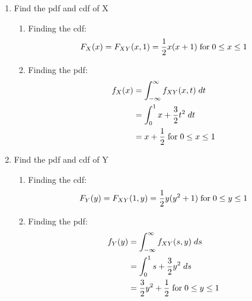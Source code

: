 \documentclass[,oneside]{article}
\begin{document}
\begin{enumerate}
\begin{enumerate}
\item Find the pdf and cdf of X\\
\begin{enumerate}
\item Finding the cdf:
\begin{align*}
F_X(x)=F_{XY}(x,1)=\frac{1}{2}x(x+1) \hspace{0.1cm} \text{for} \hspace{0.1cm} 0 \leq x \leq 1
\end{align*}
\item Finding the pdf:
\begin{align*}
f_X(x) &= \int_{-\infty}^{\infty} f_{XY}(x,t)\hspace{0.1cm}dt\\
&=\int_{0}^{1} x+\frac{3}{2}t^2\hspace{0.1cm}dt\\
&=x+\frac{1}{2} \hspace{0.1cm}\text{for} \hspace{0.1cm} 0 \leq x \leq 1
\end{align*}
\end{enumerate}
\item Find the pdf and cdf of Y\\
\begin{enumerate}
\item Finding the cdf:
\begin{align*}
F_Y(y)=F_{XY}(1,y)=\frac{1}{2}y(y^2+1) \hspace{0.1cm} \text{for} \hspace{0.1cm} 0 \leq y \leq 1
\end{align*}
\item Finding the pdf:
\begin{align*}
f_Y(y) &= \int_{-\infty}^{\infty} f_{XY}(s,y)\hspace{0.1cm}ds\\
&=\int_{0}^{1} s+\frac{3}{2}y^2\hspace{0.1cm}ds\\
&=\frac{3}{2}y^2+\frac{1}{2} \hspace{0.1cm}\text{for} \hspace{0.1cm} 0 \leq y \leq 1
\end{align*}
\end{enumerate}
\end{enumerate}

\end{enumerate}
\end{document}
